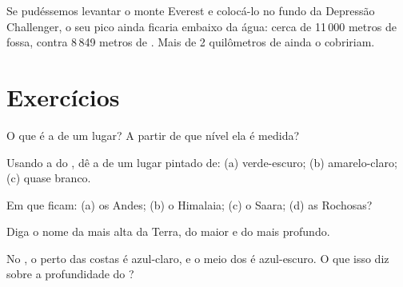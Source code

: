 \begin{example}\label{ex:g4:world-physical-map:everest-in-deep}
Se pudéssemos levantar o monte Everest e colocá-lo no fundo da Depressão
Challenger, o seu pico ainda ficaria embaixo da água: cerca de 11\,000
metros de fossa, contra 8\,849 metros de . Mais de 2 quilômetros
de  ainda o cobririam.
\end{example}

\section{Exercícios}

\begin{exercise}[$\star$]\label{exo:g4:world-physical-map:1}
O que é a  de um lugar? A partir de que nível ela é medida?
\end{exercise}

\begin{exercise}[$\star$]\label{exo:g4:world-physical-map:2}
Usando a  do , dê a  de um lugar pintado de:
(a) verde-escuro; (b) amarelo-claro; (c) quase branco.
\end{exercise}

\begin{exercise}[$\star$]\label{exo:g4:world-physical-map:3}
Em que  ficam: (a) os Andes; (b) o Himalaia; (c) o Saara;
(d) as  Rochosas?
\end{exercise}

\begin{exercise}[$\star$]\label{exo:g4:world-physical-map:4}
Diga o nome da  mais alta da Terra, do maior  e do  mais profundo.
\end{exercise}

\begin{exercise}[$\star$]\label{exo:g4:world-physical-map:5}
No , o  perto das costas é azul-claro, e o meio dos  é
azul-escuro. O que isso diz sobre a profundidade do ?
\end{exercise}

